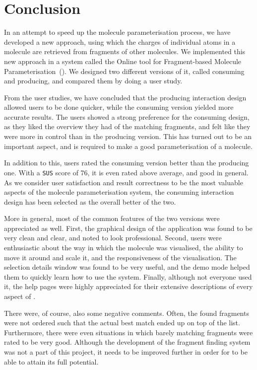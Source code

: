 \chapter{Conclusion}

In an attempt to speed up the molecule parameterisation process, we have developed a new approach, using which the charges of individual atoms in a molecule are retrieved from fragments of other molecules. We implemented this new approach in a system called the Online tool for Fragment-based Molecule Parameterisation~(\oframp). We designed two different versions of it, called consuming and producing, and compared them by doing a user study.

From the user studies, we have concluded that the producing interaction design allowed users to be done quicker, while the consuming version yielded more accurate results. The users showed a strong preference for the consuming design, as they liked the overview they had of the matching fragments, and felt like they were more in control than in the producing version. This has turned out to be an important aspect, and is required to make a good parameterisation of a molecule.

In addition to this, users rated the consuming version better than the producing one. With a \verb|SUS| score of 76, it is even rated above average, and good in general. As we consider user satisfaction and result correctness to be the most valuable aspects of the molecule parameterisation system, the consuming interaction design has been selected as the overall better of the two.

More in general, most of the common features of the two versions were appreciated as well. First, the graphical design of the application was found to be very clean and clear, and noted to look professional. Second, users were enthusiastic about the way in which the molecule was visualised, the ability to move it around and scale it, and the responsiveness of the visualisation. The selection details window was found to be very useful, and the demo mode helped them to quickly learn how to use the system. Finally, although not everyone used it, the help pages were highly appreciated for their extensive descriptions of every aspect of \oframp.

There were, of course, also some negative comments. Often, the found fragments were not ordered such that the actual best match ended up on top of the list. Furthermore, there were even situations in which barely matching fragments were rated to be very good. Although the development of the fragment finding system was not a part of this project, it needs to be improved further in order for \oframp{} to be able to attain its full potential.

